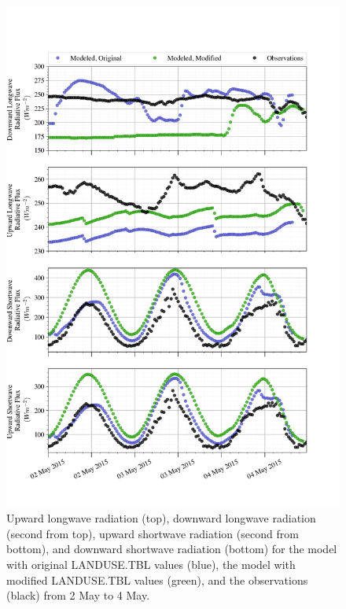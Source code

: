 {\begin{figure}[p]
    \centering
    \vspace{-10em}
    \includegraphics[width=1\linewidth]{figures/chapter6/case2_lw_sw.png}
    \caption[Idealized Case 2 - Longwave radiation.]{Upward longwave radiation (top), downward longwave radiation (second from top), upward shortwave radiation (second from bottom), and downward shortwave radiation (bottom) for the model with original LANDUSE.TBL values (blue), the model with modified LANDUSE.TBL values (green), and the observations (black) from 2 May to 4 May.}      
    \label{fig:c2:radiative}
\end{figure}

}
